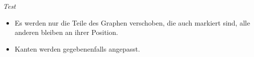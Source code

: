 \emph{Test}
\begin{itemize}
\item Es werden nur die Teile des Graphen verschoben, die auch markiert sind,
  alle anderen bleiben an ihrer Position.
\item Kanten werden gegebenenfalls angepasst.
\end{itemize}